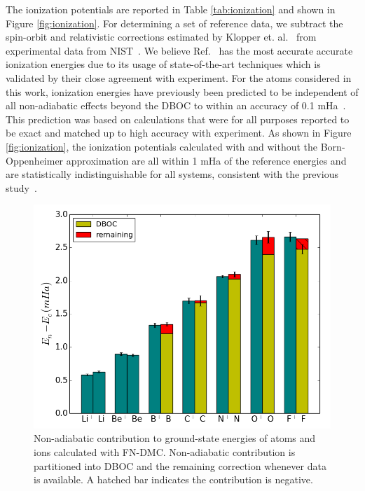 \documentclass[pra,superscriptaddress,groupedaddress,twocolumn]{revtex4}
\begin{document}
The ionization potentials are reported in Table \ref{tab:ionization} and shown in Figure \ref{fig:ionization}. For determining a set of reference data, we subtract the spin-orbit and relativistic corrections estimated by Klopper et. al.~\cite{Klopper_IP} from experimental data from NIST~\cite{NIST_Atoms}. We believe Ref.~\cite{Klopper_IP} has the most accurate accurate ionization energies due to its usage of state-of-the-art techniques which is validated by their close agreement with experiment.
For the atoms considered in this work, ionization energies have previously been predicted to be independent of all non-adiabatic effects beyond the DBOC to within an accuracy of 0.1 mHa~\cite{Klopper_IP}. This prediction was based on calculations that were for all purposes reported to be exact and matched up to high accuracy with experiment. As shown in Figure \ref{fig:ionization}, the ionization potentials calculated with and without the Born-Oppenheimer approximation are all within 1 mHa of the reference energies and are statistically indistinguishable for all systems, consistent with the previous study~\cite{Klopper_IP}.

\begin{figure}[h]
\includegraphics[scale=.37]{Figures/atom-nad-ad}
\caption{Non-adiabatic contribution to ground-state energies of atoms and ions calculated with FN-DMC. Non-adiabatic contribution is partitioned into DBOC and the remaining correction whenever data is available. A hatched bar indicates the contribution is negative. \label{fig:atom-nad-ad}} %
\end{figure}
\end{document}
